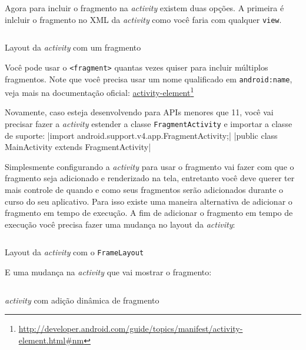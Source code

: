 \documentclass[a4paper,12pt,brazil,oneside]{book}
\begin{document}
Agora para incluir o fragmento na \emph{activity} existem duas opções. A primeira é inlcluir o fragmento no XML da \emph{activity} como você faria com qualquer \texttt{view}.

\begin{listing}[H]
\inputminted[linenos=true,fontsize=\small,frame=lines, framesep=2mm, tabsize=2,numbersep=5pt]{xml}{src/design/fragment-activity.xml}
\caption{Layout da \emph{activity} com um fragmento}
\end{listing}	

Você pode usar o \texttt{<fragment>} quantas vezes quiser para incluir múltiplos fragmentos.
Note que você precisa usar um nome qualificado em \texttt{android:name}, veja mais na documentação oficial: \href{http://developer.android.com/guide/topics/manifest/activity-element.html\#nm}{activity-element}\footnote{\href{http://developer.android.com/guide/topics/manifest/activity-element.html\#nm}{http://developer.android.com/guide/topics/manifest/activity-element.html\#nm}}

Novamente, caso esteja desenvolvendo para APIs menores que 11, você vai precisar fazer a \emph{activity} estender a classe \texttt{FragmentActivity} e importar a classe de suporte: |import android.support.v4.app.FragmentActivity;|
|public class MainActivity extends FragmentActivity|


Simplesmente configurando a \emph{activity} para usar o fragmento vai fazer com que o fragmento seja adicionado e renderizado na tela, entretanto você deve querer ter mais controle de quando e como seus fragmentos serão adicionados durante o curso do seu aplicativo. Para isso existe uma maneira alternativa de adicionar o fragmento em tempo de execução. A fim de adicionar o fragmento em tempo de execução você precisa fazer uma mudança no layout da \emph{activity}:

\begin{listing}[H]
\inputminted[linenos=true,fontsize=\small,frame=lines, framesep=2mm, tabsize=2,numbersep=5pt]{xml}{src/design/framelayout.xml}
\caption{Layout da \emph{activity} com o \texttt{FrameLayout}}
\end{listing}	

E uma mudança na \emph{activity} que vai mostrar o fragmento:

\begin{listing}[H]
\inputminted[linenos=true,fontsize=\small,frame=lines, framesep=2mm, tabsize=2,numbersep=5pt]{java}{src/design/activity-frag-dyn.java}
\caption{\emph{activity} com adição dinâmica de fragmento}
\end{listing}	
\end{document}
